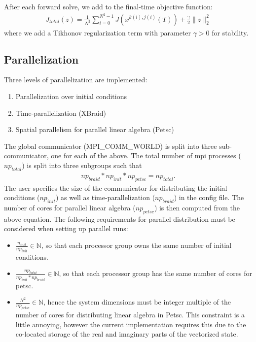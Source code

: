 \documentclass[letterpaper]{article}
\begin{document}
    After each forward solve, we add to the final-time objective function:
    \begin{align}
      J_{total}(z) = \frac{1}{N^2} \sum_{i=0}^{N^2-1} J\left(x^{k(i), j(i)}(T)\right) + \frac{\gamma}{2} \| z\|^2_2
    \end{align}
    where we add a Tikhonov regularization term with parameter $\gamma>0$ for stability.


  \subsection{Parallelization}
    Three levels of parallelization are implemented: 
      \begin{enumerate}
        \item Parallelization over initial conditions
        \item Time-parallelization (XBraid)
        \item Spatial parallelism for parallel linear algebra (Petsc)
      \end{enumerate}
      The global communicator (MPI\_COMM\_WORLD) is split into three sub-communicator, one for each of the above. The total number of mpi processes ($np_{total}$) is split into three subgroups such that 
         \begin{align*}
           np_{braid} * np_{init} * np_{petsc} = np_{total}.
         \end{align*}
      The user specifies the size of the communicator for distributing the initial conditions ($np_{init}$) as well as time-parallelization ($np_{braid}$) in the config file. The number of cores for parallel linear algebra ($np_{petsc}$) is then computed from the above equation. The following requirements for parallel distribution must be considered when setting up parallel runs:
      \begin{itemize}
        \item $\frac{n_{init}}{np_{init}} \in \mathds{N}$, so that each processor group owns the same number of initial conditions.
        \item $\frac{np_{total}}{np_{init}*np_{braid}} \in \mathds{N}$, so that each processor group has the same number of cores for petsc.
        \item $\frac{N^2}{np_{petsc}} \in \mathds{N}$, hence the system dimensions must be integer multiple of the number of cores for distributing linear algebra in Petsc. This constraint is a little annoying, however the current implementation requires this due to the co-located storage of the real and imaginary parts of the vectorized state.
      \end{itemize}
  
\end{document}
